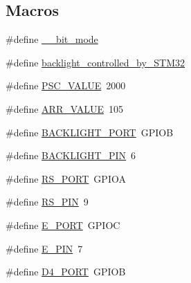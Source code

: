\subsection*{Macros}
\begin{DoxyCompactItemize}
\item 
\#define \mbox{\hyperlink{group___l_c_d_h_d44780_non_blocking_ga144c413a73ea550cef14bb17c31df074_ga144c413a73ea550cef14bb17c31df074}{\+\_\+\_\+bit\+\_\+mode}}
\item 
\#define \mbox{\hyperlink{group___l_c_d_h_d44780_non_blocking_ga15a780019b5c2b4da333f8de1a854eef_ga15a780019b5c2b4da333f8de1a854eef}{backlight\+\_\+controlled\+\_\+by\+\_\+\+S\+T\+M32}}
\item 
\#define \mbox{\hyperlink{group___l_c_d_h_d44780_non_blocking_ga075ad9c307430a82bf41cfaf18c6a3eb_ga075ad9c307430a82bf41cfaf18c6a3eb}{P\+S\+C\+\_\+\+V\+A\+L\+UE}}~2000
\item 
\#define \mbox{\hyperlink{group___l_c_d_h_d44780_non_blocking_ga7a8e8722b361c452c1468e2c195f2685_ga7a8e8722b361c452c1468e2c195f2685}{A\+R\+R\+\_\+\+V\+A\+L\+UE}}~105
\item 
\#define \mbox{\hyperlink{group___l_c_d_h_d44780_non_blocking_ga82c753863ba7e2c615843f8467562796_ga82c753863ba7e2c615843f8467562796}{B\+A\+C\+K\+L\+I\+G\+H\+T\+\_\+\+P\+O\+RT}}~G\+P\+I\+OB
\item 
\#define \mbox{\hyperlink{group___l_c_d_h_d44780_non_blocking_gabbc66f91ab4eb10b079c06095fbef994_gabbc66f91ab4eb10b079c06095fbef994}{B\+A\+C\+K\+L\+I\+G\+H\+T\+\_\+\+P\+IN}}~6
\item 
\#define \mbox{\hyperlink{group___l_c_d_h_d44780_non_blocking_gaa248ce15f60160605547ab333489781b_gaa248ce15f60160605547ab333489781b}{R\+S\+\_\+\+P\+O\+RT}}~G\+P\+I\+OA
\item 
\#define \mbox{\hyperlink{group___l_c_d_h_d44780_non_blocking_gab36f7bcb538b332ae44f0b2b2375b2de_gab36f7bcb538b332ae44f0b2b2375b2de}{R\+S\+\_\+\+P\+IN}}~9
\item 
\#define \mbox{\hyperlink{group___l_c_d_h_d44780_non_blocking_ga8f5ba7550eaecde4f356a03e006b7308_ga8f5ba7550eaecde4f356a03e006b7308}{E\+\_\+\+P\+O\+RT}}~G\+P\+I\+OC
\item 
\#define \mbox{\hyperlink{group___l_c_d_h_d44780_non_blocking_gaadf79f08aa7bd6622d96ea86e0b5cbfd_gaadf79f08aa7bd6622d96ea86e0b5cbfd}{E\+\_\+\+P\+IN}}~7
\item 
\#define \mbox{\hyperlink{group___l_c_d_h_d44780_non_blocking_ga7b72b21958bd11fd718723b95bc335d2_ga7b72b21958bd11fd718723b95bc335d2}{D4\+\_\+\+P\+O\+RT}}~G\+P\+I\+OB

\end{DoxyCompactItemize}

